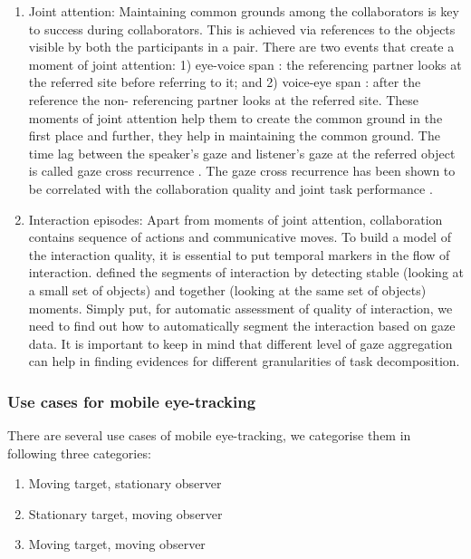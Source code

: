 \documentclass{sig-alternate}
\begin{document}
\begin{enumerate}

\item Joint attention: Maintaining common grounds among the collaborators is key to success during collaborators. This is achieved via references to the objects visible by both the participants in a pair. There are two events that create a moment of joint attention: 1) eye-voice span \cite{griffin2000eyes}: the referencing partner looks at the referred site before referring to it; and 2) voice-eye span \cite{allopenna1998tracking}: after the reference the non- referencing partner looks at the referred site. These moments of joint attention help them to create the common ground in the first place and further, they help in maintaining the common ground. The time lag between the speaker's gaze and listener's gaze at the referred object is called gaze cross recurrence \cite{richardson2007art}. The gaze cross recurrence has been shown to be correlated with the collaboration quality and joint task performance \cite{nussli2011dual}.


\item Interaction episodes: Apart from moments of joint attention, collaboration contains sequence of actions and communicative moves. To build a model of the interaction quality, it is essential to put temporal markers in the flow of interaction. \cite{sharma2012gaze} defined the segments of interaction by detecting stable (looking at a small set of objects) and together (looking at the same set of objects) moments. Simply put,
for automatic assessment of quality of interaction, we need to find out how to automatically segment the interaction based on gaze data. It is important to keep in mind that different level of gaze aggregation can help in finding evidences for different granularities of task decomposition.
\end{enumerate}


\subsubsection{Use cases for mobile eye-tracking} 

There are several use cases of mobile eye-tracking, we categorise them in following three categories:

\begin{enumerate}
\item Moving target, stationary observer
\item Stationary target, moving observer
\item Moving target, moving observer
\end{enumerate}
\end{document}
